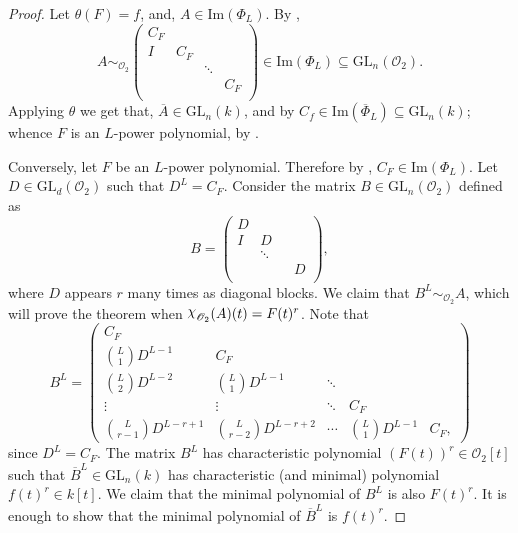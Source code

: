 \documentclass[11pt,twoside]{amsart}
\newcommand{\GL}{\mathrm{GL}}
\newcommand{\im}{\mathrm{Im}}
\newcommand{\upchi}{\raisebox{0.4ex}{$\chi$}}
\newcommand{\Char}{\upchi}
\newcommand{\R}{\mathscr{O}_2}
\theoremstyle{definition} %
\begin{document}
\begin{proof}
Let $\theta(F)=f$, and, $A\in \im(\Phi_L)$. 
By , 
$$A\sim_{\R} \begin{pmatrix}
C_F&  &   &      \\
I & C_F &  &      \\
  &   & \ddots   &   \\
  &   &   & C_F  \\
\end{pmatrix}\in\im(\Phi_L)\subseteq \GL_n(\R).$$
Applying $\theta$ we get that, $\overline{A}\in\GL_n(k)$, and by \cite[Proposition 4.2]{KunduSinghGL} $C_f\in \im(\overline{\Phi}_L)\subseteq \GL_n(k)$; whence $F$ is an $L$-power polynomial, by .

Conversely, let $F$ be an $L$-power polynomial.
Therefore by , $C_F\in \im(\Phi_L)$. Let $D\in \GL_d(\R)$ such that $D^L=C_F$.
Consider the matrix $B\in \GL_n(\R)$ defined as 
$$B= \begin{pmatrix}
D &  &   &      \\
 I & D &  &      \\
     & \ddots &  &   \\
     &   &   & D \\
\end{pmatrix}, $$
where $D$ appears $r$ many times as diagonal blocks. 
We claim that $B^L\sim_{\R}A$, which will prove the theorem when $\Char_{\R}(A)(t)=F(t)^r$.
Note that $$B^L=\begin{pmatrix} 
C_F &        &        &        &        \\ 
\binom{L}{1}D^{L-1} & C_F &        &        &        \\ 
\binom{L}{2}D^{L-2} & \binom{L}{1}D^{L-1} & \ddots &        &        \\ 
\vdots & \vdots & \ddots & C_F &        \\ 
\binom{L}{r-1}D^{L-r+1} & \binom{L}{r-2}D^{L-r+2} & \cdots & \binom{L}{1}D^{L-1} & C_F, 
\end{pmatrix}
$$ since $D^L=C_F$.
The matrix $B^L$ has characteristic polynomial $(F(t))^r\in \R[t]$ such that $\overline{B}^L\in \GL_n(k)$ has characteristic (and minimal) polynomial $f(t)^r\in k[t]$. 
We claim that the minimal polynomial of $B^L$ is also $F(t)^r$. 
It is enough to show that the minimal polynomial of $\overline{B}^L$ is $f(t)^r$.
 

\end{proof}
\end{document}
